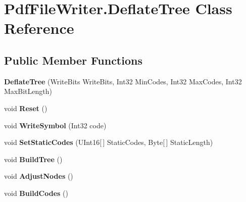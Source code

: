 \hypertarget{class_pdf_file_writer_1_1_deflate_tree}{}\section{Pdf\+File\+Writer.\+Deflate\+Tree Class Reference}
\label{class_pdf_file_writer_1_1_deflate_tree}
\subsection*{Public Member Functions}
\begin{DoxyCompactItemize}
\item 
{\bfseries Deflate\+Tree} (Write\+Bits Write\+Bits, Int32 Min\+Codes, Int32 Max\+Codes, Int32 Max\+Bit\+Length)\hypertarget{class_pdf_file_writer_1_1_deflate_tree_a9516370003996e778f598ed6cb489aed}{}\label{class_pdf_file_writer_1_1_deflate_tree_a9516370003996e778f598ed6cb489aed}

\item 
void {\bfseries Reset} ()\hypertarget{class_pdf_file_writer_1_1_deflate_tree_a3f5db2ff58b580f6d481ec595a3368f4}{}\label{class_pdf_file_writer_1_1_deflate_tree_a3f5db2ff58b580f6d481ec595a3368f4}

\item 
void {\bfseries Write\+Symbol} (Int32 code)\hypertarget{class_pdf_file_writer_1_1_deflate_tree_a3f8a418ab913ef6488b70d8f51a9650d}{}\label{class_pdf_file_writer_1_1_deflate_tree_a3f8a418ab913ef6488b70d8f51a9650d}

\item 
void {\bfseries Set\+Static\+Codes} (U\+Int16\mbox{[}$\,$\mbox{]} Static\+Codes, Byte\mbox{[}$\,$\mbox{]} Static\+Length)\hypertarget{class_pdf_file_writer_1_1_deflate_tree_a7971a3037e709e3d5cffcb3af98f25e2}{}\label{class_pdf_file_writer_1_1_deflate_tree_a7971a3037e709e3d5cffcb3af98f25e2}

\item 
void {\bfseries Build\+Tree} ()\hypertarget{class_pdf_file_writer_1_1_deflate_tree_ae20dd2a497bdc8fda240108ca8b446d1}{}\label{class_pdf_file_writer_1_1_deflate_tree_ae20dd2a497bdc8fda240108ca8b446d1}

\item 
void {\bfseries Adjust\+Nodes} ()\hypertarget{class_pdf_file_writer_1_1_deflate_tree_a35a0eb3d0338957fde2143ae2a9f9977}{}\label{class_pdf_file_writer_1_1_deflate_tree_a35a0eb3d0338957fde2143ae2a9f9977}

\item 
void {\bfseries Build\+Codes} ()\hypertarget{class_pdf_file_writer_1_1_deflate_tree_ae0c094bb781eea84a38b2686cf075309}{}\label{class_pdf_file_writer_1_1_deflate_tree_ae0c094bb781eea84a38b2686cf075309}


\end{DoxyCompactItemize}
